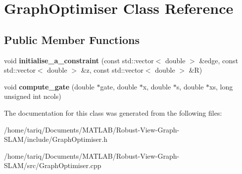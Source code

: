 \hypertarget{classGraphOptimiser}{}\section{Graph\+Optimiser Class Reference}
\label{classGraphOptimiser}
\subsection*{Public Member Functions}
\begin{DoxyCompactItemize}
\item 
void {\bfseries initialise\+\_\+a\+\_\+constraint} (const std\+::vector$<$ double $>$ \&edge, const std\+::vector$<$ double $>$ \&z, const std\+::vector$<$ double $>$ \&R)\hypertarget{classGraphOptimiser_ab58070fd7b8196c9e1bd7e41d2df0eca}{}\label{classGraphOptimiser_ab58070fd7b8196c9e1bd7e41d2df0eca}

\item 
void {\bfseries compute\+\_\+gate} (double $\ast$gate, double $\ast$x, double $\ast$s, double $\ast$xs, long unsigned int ncols)\hypertarget{classGraphOptimiser_a7be156050f369b6354a95b36ff12809c}{}\label{classGraphOptimiser_a7be156050f369b6354a95b36ff12809c}

\end{DoxyCompactItemize}


The documentation for this class was generated from the following files\+:\begin{DoxyCompactItemize}
\item 
/home/tariq/\+Documents/\+M\+A\+T\+L\+A\+B/\+Robust-\/\+View-\/\+Graph-\/\+S\+L\+A\+M/include/Graph\+Optimiser.\+h\item 
/home/tariq/\+Documents/\+M\+A\+T\+L\+A\+B/\+Robust-\/\+View-\/\+Graph-\/\+S\+L\+A\+M/src/Graph\+Optimiser.\+cpp\end{DoxyCompactItemize}
